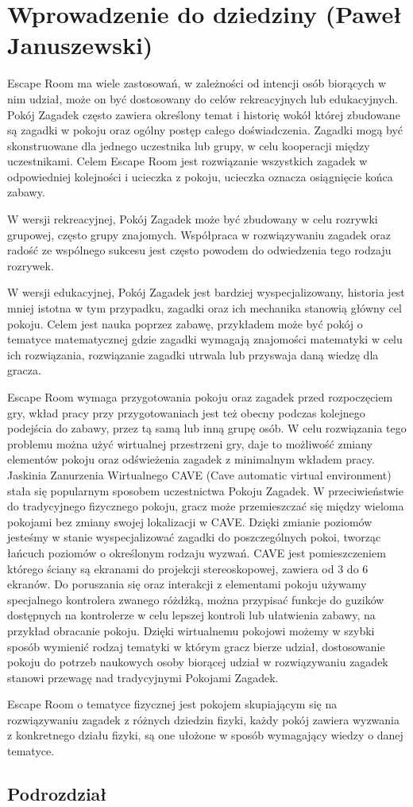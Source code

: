 \chapter{Wprowadzenie do dziedziny (Paweł Januszewski)}
\label{chap:field}

Escape Room ma wiele zastosowań, w zależności od intencji osób biorących w nim udział, może on być dostosowany do celów rekreacyjnych lub edukacyjnych. Pokój Zagadek często zawiera określony temat i historię wokół której zbudowane są zagadki w pokoju oraz ogólny postęp całego doświadczenia. 
Zagadki mogą być skonstruowane dla jednego uczestnika lub grupy, w celu kooperacji między uczestnikami. Celem Escape Room jest rozwiązanie wszystkich zagadek w odpowiedniej kolejności i ucieczka z pokoju, ucieczka oznacza osiągnięcie końca zabawy.

W wersji rekreacyjnej, Pokój Zagadek może być zbudowany w celu rozrywki grupowej, często grupy znajomych. Współpraca w rozwiązywaniu zagadek oraz radość ze wspólnego sukcesu jest często powodem do odwiedzenia tego rodzaju rozrywek. 

W wersji edukacyjnej, Pokój Zagadek jest bardziej wyspecjalizowany, historia jest mniej istotna w tym przypadku, zagadki oraz ich mechanika stanowią główny cel pokoju.
Celem jest nauka poprzez zabawę, przykładem może być pokój o tematyce matematycznej gdzie zagadki wymagają znajomości matematyki w celu ich rozwiązania, rozwiązanie zagadki utrwala lub przyswaja daną wiedzę dla gracza.


Escape Room wymaga przygotowania pokoju oraz zagadek przed rozpoczęciem gry, wkład pracy przy przygotowaniach jest też obecny podczas kolejnego podejścia do zabawy, przez tą samą lub inną grupę osób. W celu rozwiązania tego problemu można użyć wirtualnej przestrzeni gry, daje to możliwość zmiany elementów pokoju oraz odświeżenia zagadek z minimalnym wkładem pracy.
Jaskinia Zanurzenia Wirtualnego CAVE (Cave automatic virtual environment) stała się popularnym sposobem uczestnictwa Pokoju Zagadek. W przeciwieństwie do tradycyjnego fizycznego pokoju, gracz może przemieszczać się między wieloma pokojami bez zmiany swojej lokalizacji w CAVE. Dzięki zmianie poziomów jesteśmy w stanie wyspecjalizować zagadki do poszczególnych pokoi, tworząc łańcuch poziomów o określonym rodzaju wyzwań.
CAVE jest pomieszczeniem którego ściany są ekranami do projekcji stereoskopowej, zawiera od 3 do 6 ekranów. Do poruszania się oraz interakcji z elementami pokoju używamy specjalnego kontrolera zwanego różdżką, można przypisać funkcje do guzików dostępnych na kontrolerze w celu lepszej kontroli lub ułatwienia zabawy, na przykład obracanie pokoju.
Dzięki wirtualnemu pokojowi możemy w szybki sposób wymienić rodzaj tematyki w którym gracz bierze udział, dostosowanie pokoju do potrzeb naukowych osoby biorącej udział w rozwiązywaniu zagadek stanowi przewagę nad tradycyjnymi Pokojami Zagadek.

Escape Room o tematyce fizycznej jest pokojem skupiającym się na rozwiązywaniu zagadek z różnych dziedzin fizyki, każdy pokój zawiera wyzwania z konkretnego działu fizyki, są one ułożone w sposób wymagający wiedzy o danej tematyce. 



\section{Podrozdział}
